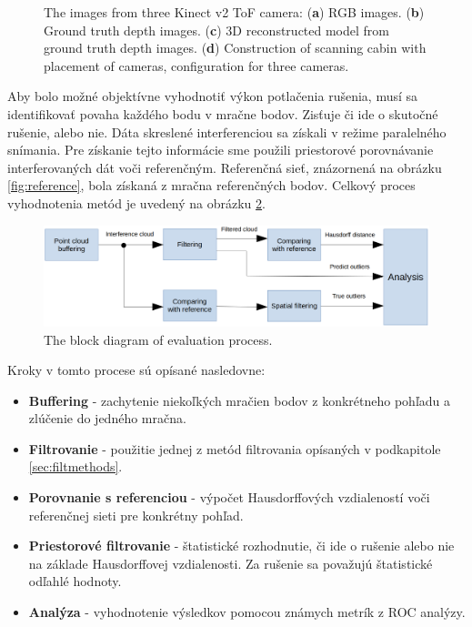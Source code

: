 \begin{figure}[H]
	\caption{The images from three Kinect v2 ToF camera: (\textbf{a}) RGB images. (\textbf{b}) Ground truth depth images. (\textbf{c}) 3D reconstructed model from ground truth depth images.  (\textbf{d}) Construction of scanning cabin with placement of cameras, configuration for three cameras.}
	\label{fig:gt}
\end{figure}

Aby bolo možné objektívne vyhodnotiť výkon potlačenia rušenia, musí sa identifikovať povaha každého bodu v mračne bodov. Zisťuje či ide o skutočné rušenie, alebo nie. Dáta skreslené interferenciou sa získali v režime paralelného snímania. Pre získanie tejto informácie sme použili priestorové porovnávanie interferovaných dát voči referenčným. Referenčná sieť, znázornená na obrázku \ref {fig:reference}, bola získaná z mračna referenčných bodov. Celkový proces vyhodnotenia metód je uvedený na obrázku \ref{fig:eval}.

\begin{figure}[H]
	\centering
	\includegraphics[width=\textwidth]{figures/eval.png}
	\caption{The block diagram of evaluation process.}
	\label{fig:eval}
\end{figure}

\newpage
Kroky v tomto procese sú opísané nasledovne:

\begin{itemize}
\item \textbf{Buffering} - zachytenie niekoľkých mračien bodov z konkrétneho pohľadu a zlúčenie do jedného mračna.
\item \textbf{Filtrovanie} - použitie jednej z metód filtrovania opísaných v podkapitole \ref{sec:filtmethods}.
\item \textbf{Porovnanie s referenciou} - výpočet Hausdorffových vzdialeností voči referenčnej sieti pre konkrétny pohľad.
\item \textbf{Priestorové filtrovanie} - štatistické rozhodnutie, či ide o rušenie alebo nie na základe Hausdorffovej vzdialenosti. Za rušenie sa považujú štatistické odľahlé hodnoty.
\item \textbf{Analýza} - vyhodnotenie výsledkov pomocou známych metrík z ROC analýzy.
\end{itemize}


